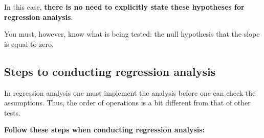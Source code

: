 \documentclass[
]{book}
\begin{document}
In this case, \textbf{there is no need to explicitly state these hypotheses for regression analysis}.

You must, however, know what is being tested: the null hypothesis that the slope is equal to zero.

\subsection{Steps to conducting regression analysis}\label{LSR_steps}

In regression analysis one must implement the analysis before one can check the assumptions. Thus, the order of operations is a bit different from that of other tests.

\textbf{Follow these steps when conducting regression analysis:}
\end{document}
